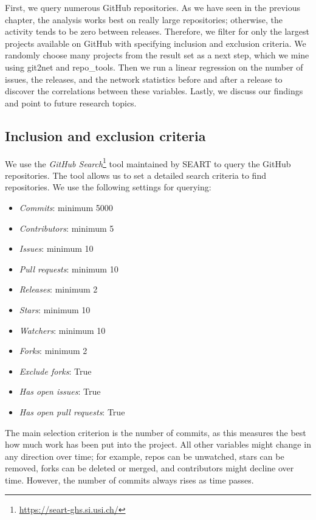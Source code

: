 First, we query numerous GitHub repositories. As we have seen in the previous chapter, the analysis works best on really large repositories; otherwise, the activity tends to be zero between releases. Therefore, we filter for only the largest projects available on GitHub with specifying inclusion and exclusion criteria. We randomly choose many projects from the result set as a next step, which we mine using git2net and repo\_tools. Then we run a linear regression on the number of issues, the releases, and the network statistics before and after a release to discover the correlations between these variables. Lastly, we discuss our findings and point to future research topics.

\subsection{Inclusion and exclusion criteria}

We use the \textit{GitHub Search}\footnote{\url{https://seart-ghs.si.usi.ch/}} tool maintained by SEART to query the GitHub repositories. The tool allows us to set a detailed search criteria to find repositories. We use the following settings for querying:

\begin{itemize}
    \item \textit{Commits}: minimum 5000
    \item \textit{Contributors}: minimum 5
    \item \textit{Issues}: minimum 10
    \item \textit{Pull requests}: minimum 10
    \item \textit{Releases}: minimum 2
    \item \textit{Stars}: minimum 10
    \item \textit{Watchers}: minimum 10
    \item \textit{Forks}: minimum 2
    \item \textit{Exclude forks}: True
    \item \textit{Has open issues}: True
    \item \textit{Has open pull requests}: True
\end{itemize}

The main selection criterion is the number of commits, as this measures the best how much work has been put into the project. All other variables might change in any direction over time; for example, repos can be unwatched, stars can be removed, forks can be deleted or merged, and contributors might decline over time. However, the number of commits always rises as time passes.

